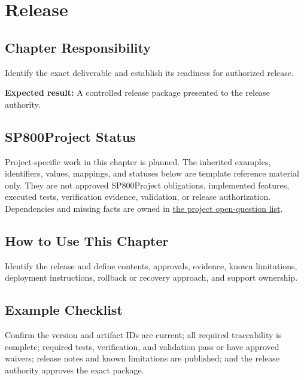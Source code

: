 \chapter{Release}
\section{Chapter Responsibility}
\label{Section:ReleaseResponsibility}
Identify the exact deliverable and establish its readiness for authorized release.

\noindent\textbf{Expected result:} A controlled release package presented to the release authority.

\section{SP800Project Status}
\label{Section:SP800StatusRelease}
Project-specific work in this chapter is planned. The inherited examples,
identifiers, values, mappings, and statuses below are template reference
material only. They are not approved SP800Project obligations, implemented features,
executed tests, verification evidence, validation, or release authorization.
Dependencies and missing facts are owned in
\hyperref[Section:SP800OpenQuestions]{the project open-question list}.

\section{How to Use This Chapter}
Identify the release and define contents, approvals, evidence, known limitations, deployment instructions, rollback or recovery approach, and support ownership.
\section{Example Checklist}
Confirm the version and artifact IDs are current; all required traceability is complete; required tests, verification, and validation pass or have approved waivers; release notes and known limitations are published; and the release authority approves the exact package.
